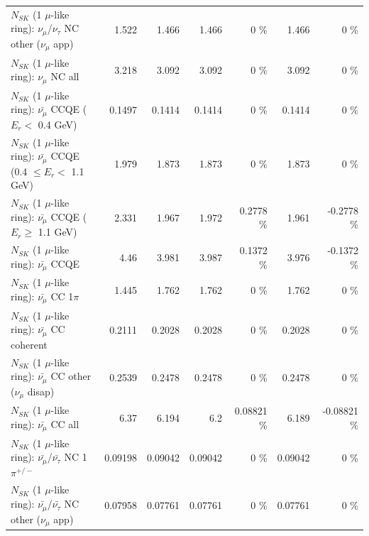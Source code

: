 \begin{table}
\begin{tabular}{| l | r | r | r  r | r  r |}
     $N_{SK}$ (1 $\mu$-like ring): $\nu_\mu$/$\nu_\tau$ NC other ($\nu_\mu$ app) &           1.522 &           1.466 &           1.466 &        0 \%  &           1.466 &        0 \%  \\ 
                                $N_{SK}$ (1 $\mu$-like ring): $\nu_{\mu}$ NC all &           3.218 &           3.092 &           3.092 &        0 \%  &           3.092 &        0 \%  \\ 
\hline
\hline
\hline
          $N_{SK}$ (1 $\mu$-like ring): $\bar{\nu_\mu}$ CCQE ($E_{r} <$ 0.4 GeV) &          0.1497 &          0.1414 &          0.1414 &        0 \%  &          0.1414 &        0 \%  \\ 
 $N_{SK}$ (1 $\mu$-like ring): $\bar{\nu_\mu}$ CCQE (0.4 $\leq E_{r} <$ 1.1 GeV) &           1.979 &           1.873 &           1.873 &        0 \%  &           1.873 &        0 \%  \\ 
       $N_{SK}$ (1 $\mu$-like ring): $\bar{\nu_\mu}$ CCQE ($E_{r} \geq$ 1.1 GeV) &           2.331 &           1.967 &           1.972 &   0.2778 \%  &           1.961 &  -0.2778 \%  \\ 
\hline
                              $N_{SK}$ (1 $\mu$-like ring): $\bar{\nu_\mu}$ CCQE &            4.46 &           3.981 &           3.987 &   0.1372 \%  &           3.976 &  -0.1372 \%  \\ 
                         $N_{SK}$ (1 $\mu$-like ring): $\bar{\nu_\mu}$ CC 1$\pi$ &           1.445 &           1.762 &           1.762 &        0 \%  &           1.762 &        0 \%  \\ 
                       $N_{SK}$ (1 $\mu$-like ring): $\bar{\nu_\mu}$ CC coherent &          0.2111 &          0.2028 &          0.2028 &        0 \%  &          0.2028 &        0 \%  \\ 
        $N_{SK}$ (1 $\mu$-like ring): $\bar{\nu_\mu}$ CC other ($\nu_\mu$ disap) &          0.2539 &          0.2478 &          0.2478 &        0 \%  &          0.2478 &        0 \%  \\ 
                          $N_{SK}$ (1 $\mu$-like ring): $\bar{\nu_{\mu}}$ CC all &            6.37 &           6.194 &             6.2 &  0.08821 \%  &           6.189 & -0.08821 \%  \\ 
\hline
  $N_{SK}$ (1 $\mu$-like ring): $\bar{\nu_\mu}$/$\bar{\nu_\tau}$ NC 1$\pi^{+/-}$ &         0.09198 &         0.09042 &         0.09042 &        0 \%  &         0.09042 &        0 \%  \\ 
$N_{SK}$ (1 $\mu$-like ring): $\bar{\nu_\mu}$/$\bar{\nu_\tau}$ NC other ($\nu_\mu$ app) &         0.07958 &         0.07761 &         0.07761 &        0 \%  &         0.07761 &        0 \%  \\ 

\end{tabular}
\end{table}

